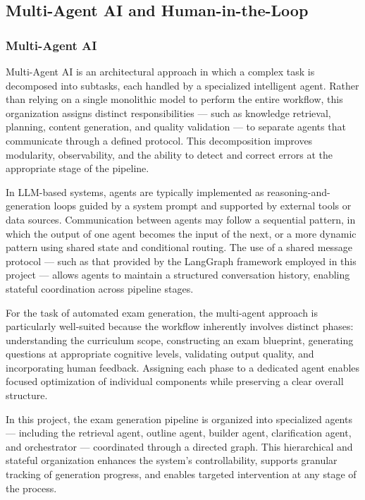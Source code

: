 \documentclass[12pt,a4paper]{article}
\begin{document}
\subsection{Multi-Agent AI and Human-in-the-Loop}

\subsubsection{Multi-Agent AI}

Multi-Agent AI is an architectural approach in which a complex task is decomposed into subtasks, each handled by a specialized intelligent agent. Rather than relying on a single monolithic model to perform the entire workflow, this organization assigns distinct responsibilities — such as knowledge retrieval, planning, content generation, and quality validation — to separate agents that communicate through a defined protocol. This decomposition improves modularity, observability, and the ability to detect and correct errors at the appropriate stage of the pipeline.

In LLM-based systems, agents are typically implemented as reasoning-and-generation loops guided by a system prompt and supported by external tools or data sources. Communication between agents may follow a sequential pattern, in which the output of one agent becomes the input of the next, or a more dynamic pattern using shared state and conditional routing. The use of a shared message protocol — such as that provided by the LangGraph framework employed in this project — allows agents to maintain a structured conversation history, enabling stateful coordination across pipeline stages.

For the task of automated exam generation, the multi-agent approach is particularly well-suited because the workflow inherently involves distinct phases: understanding the curriculum scope, constructing an exam blueprint, generating questions at appropriate cognitive levels, validating output quality, and incorporating human feedback. Assigning each phase to a dedicated agent enables focused optimization of individual components while preserving a clear overall structure.

In this project, the exam generation pipeline is organized into specialized agents — including the retrieval agent, outline agent, builder agent, clarification agent, and orchestrator — coordinated through a directed graph. This hierarchical and stateful organization enhances the system's controllability, supports granular tracking of generation progress, and enables targeted intervention at any stage of the process.
\end{document}
